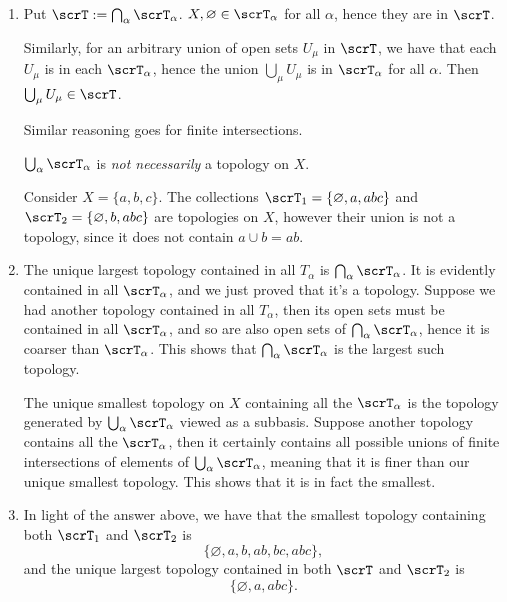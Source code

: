 \documentclass{article}
\begin{document}
\begin{enumerate}[label=(\alph*)]
    \item
        Put $\scrT := \bigcap_\alpha \scrT_\alpha$.
        $X, \varnothing \in \scrT_\alpha$ for all $\alpha$, hence they are in $\scrT$.

        Similarly, for an arbitrary union of open sets $U_\mu$ in $\scrT$, we have that each $U_\mu$ is in each $\scrT_\alpha$, hence the union $\bigcup_\mu U_\mu$ is in $\scrT_\alpha$ for all $\alpha$.
        Then $\bigcup_\mu U_\mu \in \scrT$.

        Similar reasoning goes for finite intersections.

        $\bigcup_\alpha \scrT_\alpha$ is \textit{not necessarily} a topology on $X$.

        Consider $X = \{a,b,c\}$.
        The collections $\scrT_1 = \{\varnothing,a,abc\}$ and $\scrT_2 = \{\varnothing,b,abc\}$ are topologies on $X$, however their union is not a topology, since it does not contain $a \cup b = ab$.

        \item
            The unique largest topology contained in all $T_\alpha$ is $\bigcap_\alpha \scrT_\alpha$.
            It is evidently contained in all $\scrT_\alpha$, and we just proved that it's a topology.
            Suppose we had another topology contained in all $T_\alpha$, then its open sets must be contained in all $\scrT_\alpha$, and so are also open sets of $\bigcap_\alpha \scrT_\alpha$, hence it is coarser than $\scrT_\alpha$.
            This shows that $\bigcap_\alpha \scrT_\alpha$ is the largest such topology.

            The unique smallest topology on $X$ containing all the $\scrT_\alpha$ is the topology generated by $\bigcup_\alpha \scrT_\alpha$ viewed as a subbasis.
            Suppose another topology contains all the $\scrT_\alpha$, then it certainly contains all possible unions of finite intersections of elements of $\bigcup_\alpha \scrT_\alpha$, meaning that it is finer than our unique smallest topology.
            This shows that it is in fact the smallest.
        \item
            In light of the answer above, we have that the smallest topology containing both $\scrT_1$ and $\scrT_2$ is
            \[
                \{\varnothing, a, b, ab, bc, abc\},
            \]
            and the unique largest topology contained in both $\scrT$ and $\scrT_2$ is
            \[
                \{\varnothing,a,abc\}.
            \]
\end{enumerate}
\end{document}
